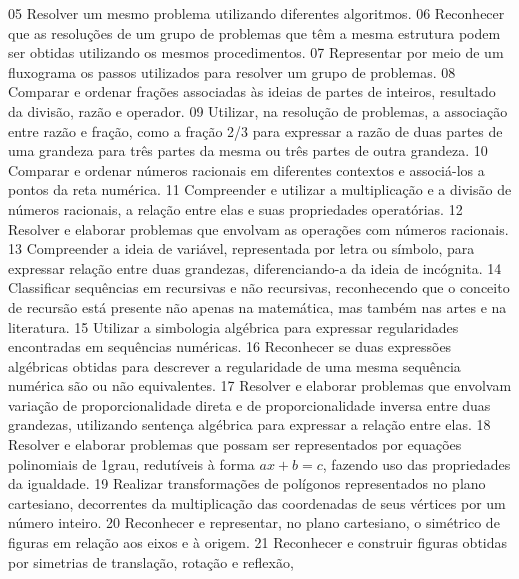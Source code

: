 {{{			}
			{05}{%
				Resolver um mesmo problema utilizando diferentes algoritmos.
			}
			{06}{%
				Reconhecer que as resoluções de um grupo de problemas que têm a mesma
				estrutura podem ser obtidas utilizando os mesmos procedimentos.
			}
			{07}{%
				Representar por meio de um fluxograma os passos utilizados para resolver um
				grupo de problemas.
			}
			{08}{%
				Comparar e ordenar frações associadas às ideias de partes de inteiros, resultado
				da divisão, razão e operador.
			}
			{09}{%
				Utilizar, na resolução de problemas, a associação entre razão e fração, como a
				fração 2/3 para expressar a razão de duas partes de uma grandeza para três partes da mesma
				ou três partes de outra grandeza.
			}
			{10}{%
				Comparar e ordenar números racionais em diferentes contextos e associá-los a
				pontos da reta numérica.
			}
			{11}{%
				Compreender e utilizar a multiplicação e a divisão de números racionais, a relação
				entre elas e suas propriedades operatórias.
			}
			{12}{%
				Resolver e elaborar problemas que envolvam as operações com números racionais.
			}
			{13}{%
				Compreender a ideia de variável, representada por letra ou símbolo, para expressar
				relação entre duas grandezas, diferenciando-a da ideia de incógnita.
			}
			{14}{%
				Classificar sequências em recursivas e não recursivas, reconhecendo que o
				conceito de recursão está presente não apenas na matemática, mas também nas artes e na
				literatura.
			}
			{15}{%
				Utilizar a simbologia algébrica para expressar regularidades encontradas em
				sequências numéricas.
			}
			{16}{%
				Reconhecer se duas expressões algébricas obtidas para descrever a regularidade
				de uma mesma sequência numérica são ou não equivalentes.
			}
			{17}{%
				Resolver e elaborar problemas que envolvam variação de proporcionalidade
				direta e de proporcionalidade inversa entre duas grandezas, utilizando sentença algébrica para
				expressar a relação entre elas.
			}
			{18}{%
				Resolver e elaborar problemas que possam ser representados por equações
				polinomiais de 1\textordmasculine grau, redutíveis à forma \(ax + b = c\), fazendo uso das propriedades da igualdade.
			}
      {19}{%
        Realizar transformações de polígonos representados no plano cartesiano,
        decorrentes da multiplicação das coordenadas de seus vértices por um número inteiro.
      }
			{20}{%
				Reconhecer e representar, no plano cartesiano, o simétrico de figuras em relação
				aos eixos e à origem.
			}
			{21}{%
				Reconhecer e construir figuras obtidas por simetrias de translação, rotação e reflexão,
}}}
